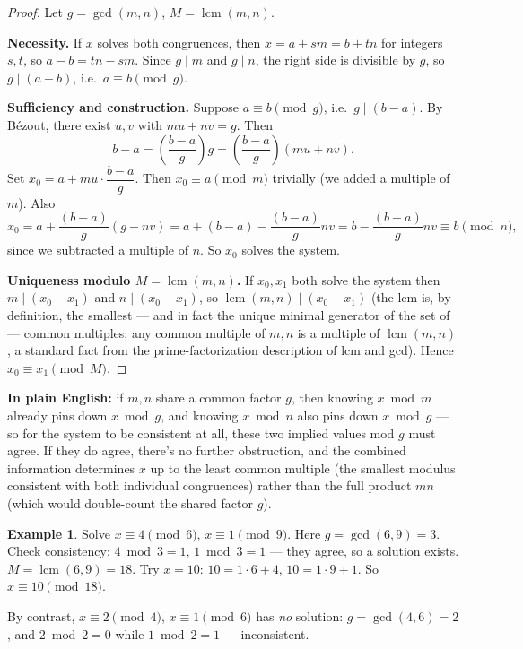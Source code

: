 \documentclass[11pt]{article}
\theoremstyle{definition}
\newtheorem{example}[theorem]{Example}
\theoremstyle{remark}
\DeclareMathOperator{\lcmop}{lcm}
\begin{document}
\begin{proof}
Let $g = \gcd(m,n)$, $M=\lcmop(m,n)$.

\textbf{Necessity.} If $x$ solves both congruences, then $x = a + sm = b+tn$ for integers $s,t$, so $a - b = tn - sm$. Since $g \mid m$ and $g\mid n$, the right side is divisible by $g$, so $g \mid (a-b)$, i.e.\ $a \equiv b \pmod g$.

\textbf{Sufficiency and construction.} Suppose $a\equiv b\pmod g$, i.e.\ $g \mid (b-a)$. By Bézout, there exist $u,v$ with $mu+nv=g$. Then
\[
b - a = \left(\frac{b-a}{g}\right) g = \left(\frac{b-a}{g}\right)(mu+nv).
\]
Set $x_0 = a + mu\cdot\dfrac{b-a}{g}$. Then $x_0 \equiv a \pmod m$ trivially (we added a multiple of $m$). Also
\[
x_0 = a + \frac{(b-a)}{g}(g - nv) = a + (b-a) - \frac{(b-a)}{g}nv = b - \frac{(b-a)}{g}nv \equiv b \pmod n,
\]
since we subtracted a multiple of $n$. So $x_0$ solves the system.

\textbf{Uniqueness modulo $M=\lcmop(m,n)$.} If $x_0,x_1$ both solve the system then $m \mid (x_0-x_1)$ and $n\mid(x_0-x_1)$, so $\lcmop(m,n) \mid (x_0-x_1)$ (the lcm is, by definition, the smallest — and in fact the unique minimal generator of the set of — common multiples; any common multiple of $m,n$ is a multiple of $\lcmop(m,n)$, a standard fact from the prime-factorization description of lcm and gcd). Hence $x_0\equiv x_1 \pmod M$.
\end{proof}

\noindent\textbf{In plain English:} if $m,n$ share a common factor $g$, then knowing $x \bmod m$ already pins down $x \bmod g$, and knowing $x\bmod n$ also pins down $x\bmod g$ — so for the system to be consistent at all, these two implied values mod $g$ must agree. If they do agree, there's no further obstruction, and the combined information determines $x$ up to the least common multiple (the smallest modulus consistent with both individual congruences) rather than the full product $mn$ (which would double-count the shared factor $g$).

\begin{example}
Solve $x\equiv4\pmod6$, $x\equiv1\pmod9$. Here $g=\gcd(6,9)=3$. Check consistency: $4\bmod3=1$, $1\bmod3=1$ — they agree, so a solution exists. $M=\lcmop(6,9)=18$. Try $x=10$: $10=1\cdot6+4$\checkmark, $10=1\cdot9+1$\checkmark. So $x\equiv10\pmod{18}$.

By contrast, $x\equiv2\pmod4$, $x\equiv1\pmod6$ has \emph{no} solution: $g=\gcd(4,6)=2$, and $2\bmod2=0$ while $1\bmod2=1$ — inconsistent.
\end{example}
\end{document}
